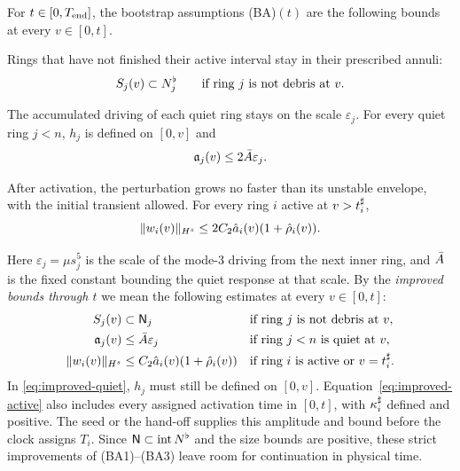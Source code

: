 For $t\in[0,T_{\mathrm{end}}]$, the bootstrap assumptions (BA)$(t)$ are the following
bounds at every $v\in[0,t]$.
\begin{description}[font=\normalfont]
\item[(BA1)] Rings that have not finished their active interval stay in their
prescribed annuli:
\begin{equation}
\label{eq:BA-support}
S_j(v)\subset N^{\flat}_j\qquad\text{if ring $j$ is not debris at $v$}.
\end{equation}
\item[(BA2)] The accumulated driving of each quiet ring stays on the scale
$\varepsilon_j$. For every quiet ring $j<n$, $h_j$ is defined on
$[0,v]$ and
\begin{equation}
\label{eq:BA-quiet}
\mathfrak{a}_j(v)\le2\bar A\varepsilon_j.
\end{equation}
\item[(BA3)] After activation, the perturbation grows no faster than its
unstable envelope, with the initial transient allowed. For every ring $i$
active at $v>t^\sharp_i$,
\begin{equation}
\label{eq:BA-active}
\|w_i(v)\|_{H^s}\le2C_2\hat a_i(v)(1+\hat\rho_i(v)).
\end{equation}
\end{description}
Here $\varepsilon_j=\mu s_j^5$ is the scale of the mode-$3$ driving from
the next inner ring, and $\bar A$ is the fixed constant bounding the quiet
response at that scale.
By the \emph{improved bounds through $t$} we mean the following estimates
at every $v\in[0,t]$:
\begin{align}
S_j(v)&\subset\mathsf{N}_j
&&\text{if ring $j$ is not debris at $v$},\label{eq:improved-support}\\
\mathfrak{a}_j(v)&\le\bar A\varepsilon_j
&&\text{if ring $j<n$ is quiet at $v$},\label{eq:improved-quiet}\\
\|w_i(v)\|_{H^s}&\le C_2\hat a_i(v)(1+\hat\rho_i(v))
&&\text{if ring $i$ is active or }v=t^\sharp_i.\label{eq:improved-active}
\end{align}
In \eqref{eq:improved-quiet}, $h_j$ must still be defined on $[0,v]$.
Equation~\eqref{eq:improved-active} also includes every assigned activation
time in $[0,t]$, with $\kappa^\sharp_i$ defined and positive. The seed or the hand-off
supplies this amplitude and bound before the clock assigns $T_i$. Since
$\mathsf{N}\subset\operatorname{int}N^{\flat}$ and the size bounds are positive,
these strict improvements of (BA1)--(BA3) leave room for continuation in
physical time.

